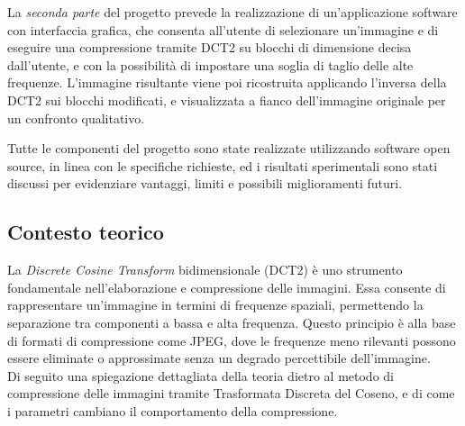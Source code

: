 La \textit{seconda parte} del progetto prevede la realizzazione di un'applicazione software con interfaccia grafica, che consenta all'utente di selezionare un'immagine e di eseguire una compressione tramite DCT2 su blocchi di dimensione decisa dall'utente, e con la possibilità di impostare una soglia di taglio delle alte frequenze. L'immagine risultante viene poi ricostruita applicando l'inversa della DCT2 sui blocchi modificati, e visualizzata a fianco dell'immagine originale per un confronto qualitativo.

Tutte le componenti del progetto sono state realizzate utilizzando software open source, in linea con le specifiche richieste, ed i risultati sperimentali sono stati discussi per evidenziare vantaggi, limiti e possibili miglioramenti futuri.

\subsection{Contesto teorico}
La \textit{Discrete Cosine Transform} bidimensionale (DCT2) è uno strumento fondamentale nell’elaborazione e compressione delle immagini. Essa consente di rappresentare un'immagine in termini di frequenze spaziali, permettendo la separazione tra componenti a bassa e alta frequenza. Questo principio è alla base di formati di compressione come JPEG, dove le frequenze meno rilevanti possono essere eliminate o approssimate senza un degrado percettibile dell'immagine.\\

Di seguito una spiegazione dettagliata della teoria dietro al metodo di compressione delle immagini tramite Trasformata Discreta del Coseno, e di come i parametri cambiano il comportamento della compressione.